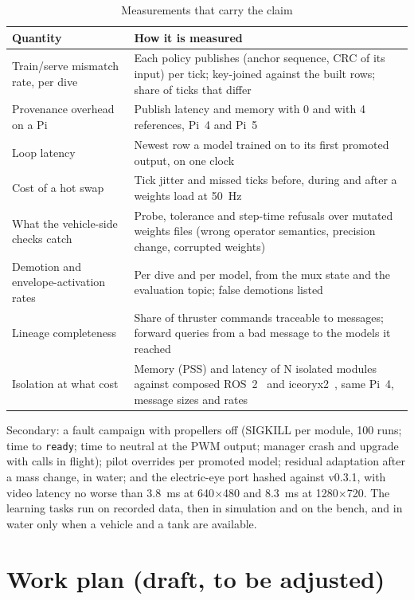 \documentclass[conference]{IEEEtran}
\begin{document}
\begin{table}[t]
\caption{Measurements that carry the claim}
\label{tab:measure}
\centering
\footnotesize
\begin{tabular}{@{}L{0.24\textwidth}L{0.72\textwidth}@{}}
\toprule
Quantity & How it is measured \\
\midrule
Train/serve mismatch rate, per dive &
Each policy publishes (anchor sequence, CRC of its input) per tick;
key-joined against the built rows; share of ticks that differ \\
Provenance overhead on a Pi &
Publish latency and memory with 0 and with 4 references, Pi~4 and Pi~5 \\
Loop latency &
Newest row a model trained on to its first promoted output, on one clock \\
Cost of a hot swap &
Tick jitter and missed ticks before, during and after a weights load at
50~Hz \\
What the vehicle-side checks catch &
Probe, tolerance and step-time refusals over mutated weights files (wrong
operator semantics, precision change, corrupted weights) \\
Demotion and envelope-activation rates &
Per dive and per model, from the mux state and the evaluation topic; false
demotions listed \\
Lineage completeness &
Share of thruster commands traceable to messages; forward queries from a bad
message to the models it reached \\
Isolation at what cost &
Memory (PSS) and latency of N isolated modules against composed
ROS~2~\cite{macenski2023composition} and iceoryx2~\cite{iceoryx2}, same
Pi~4, message sizes and rates \\
\bottomrule
\end{tabular}
\end{table}

Secondary: a fault campaign with propellers off (SIGKILL per module, 100
runs; time to \texttt{ready}; time to neutral at the PWM output; manager
crash and upgrade with calls in flight); pilot overrides per promoted model;
residual adaptation after a mass change, in water; and the electric-eye port
hashed against v0.3.1, with video latency no worse than 3.8~ms at
640$\times$480 and 8.3~ms at 1280$\times$720. The learning tasks run on
recorded data, then in simulation and on the bench, and in water only when a
vehicle and a tank are available.

\section{Work plan (draft, to be adjusted)}
\end{document}
